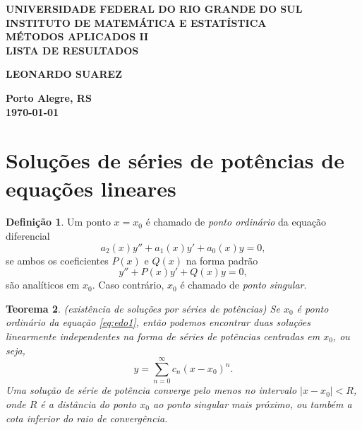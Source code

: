 \documentclass[12pt]{article}
\theoremstyle{plain}
\newtheorem{thm}{Teorema}[section]
\theoremstyle{definition}
\newtheorem{defn}[thm]{Definição}
\theoremstyle{remark}
\begin{document}
\begin{center}
    \textbf{\large UNIVERSIDADE FEDERAL DO RIO GRANDE DO SUL} \\
    \textbf{\large INSTITUTO DE MATEMÁTICA E ESTATÍSTICA} \\
    \vspace{3cm}
    \textbf{\Large MÉTODOS APLICADOS II} \\
    \vspace{1cm}
    \textbf{\large LISTA DE RESULTADOS} \\
    \vspace{3cm}

    \textbf{LEONARDO SUAREZ}

    \vfill
    \textbf{\large Porto Alegre, RS} \\
    \textbf{\large \today}
\end{center}

\newpage
\tableofcontents
\newpage

\section{Soluções de séries de potências de equações lineares}

\begin{defn}
    Um ponto \(x=x_0\) é chamado de \emph{ponto ordinário} da equação diferencial
    \begin{equation}\label{eq:edo1}
        a_2(x)y'' + a_1(x)y' + a_0(x)y = 0,
    \end{equation}
    \noindent se ambos os coeficientes \(P(x)\) e \(Q(x)\) na forma padrão
    \begin{equation}\label{eq:edo2}
        y'' + P(x)y' + Q(x)y = 0,
    \end{equation}
\noindent são analíticos em \(x_0\). Caso contrário, \(x_0\) é chamado de \emph{ponto singular}.
\end{defn}

\begin{thm} (existência de soluções por séries de potências)
    Se \(x_0\) é ponto ordinário da equação \eqref{eq:edo1}, então podemos encontrar duas soluções linearmente independentes na forma de séries de potências centradas em \(x_0\), ou seja,
    \[
    y = \sum_{n=0}^{\infty} c_n (x - x_0)^n.
    \]
    Uma solução de série de potência converge pelo menos no intervalo \(|x - x_0| < R\), onde \(R\) é a distância do ponto \(x_0\) ao ponto singular mais próximo, ou também a \emph{cota inferior} do raio de convergência.
\end{thm}
\end{document}

